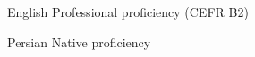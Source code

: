 
\begin{cvskills}

  \cvskill
    {English} %
    {Professional proficiency (CEFR B2)} %

  \cvskill
    {Persian} %
    {Native proficiency} %
\end{cvskills}
